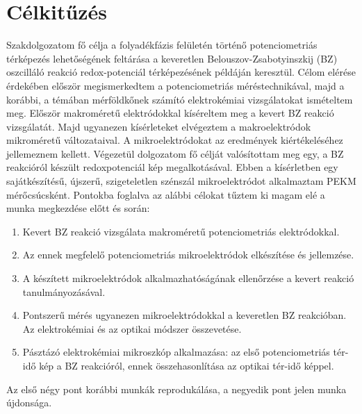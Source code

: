 \chapter{Célkitűzés}
\pagestyle{headings}

Szakdolgozatom fő célja a folyadékfázis felületén történő potenciometriás térképezés lehetőségének feltárása a keveretlen Belouszov-Zsabotyinszkij (BZ) oszcilláló reakció redox-potenciál térképezésének példáján keresztül. Célom elérése érdekében először megismerkedtem a potenciometriás méréstechnikával, majd a korábbi, a témában mérföldkőnek számító elektrokémiai vizsgálatokat ismételtem meg. Először makroméretű elektródokkal kíséreltem meg a kevert BZ reakció vizsgálatát. Majd ugyanezen kísérleteket elvégeztem a makroelektródok mikroméretű változataival. A mikroelektródokat az eredmények kiértékeléséhez jellemeznem kellett. Végezetül dolgozatom fő célját valósítottam meg egy, a BZ reakcióról készült redoxpotenciál kép megalkotásával. Ebben a kísérletben egy sajátkészítésű, újszerű, szigeteletlen szénszál mikroelektródot alkalmaztam PEKM mérőcsúcsként. Pontokba foglalva az alábbi célokat tűztem ki magam elé a munka megkezdése előtt és során:

\begin{enumerate}
\item Kevert BZ reakció vizsgálata makroméretű potenciometriás elektródokkal.
\item Az ennek megfelelő potenciometriás mikroelektródok elkészítése és jellemzése.
\item A készített mikroelektródok alkalmazhatóságának ellenőrzése a kevert reakció tanulmányozásával.
\item Pontszerű mérés ugyanezen mikroelektródokkal a keveretlen BZ reakcióban. Az elektrokémiai és az optikai módszer összevetése.
\item Pásztázó elektrokémiai mikroszkóp alkalmazása: az első potenciometriás tér-idő kép a BZ reakcióról, ennek összehasonlítása az optikai tér-idő képpel.
\end{enumerate}

Az első négy pont korábbi munkák reprodukálása, a negyedik pont jelen munka újdonsága. 


